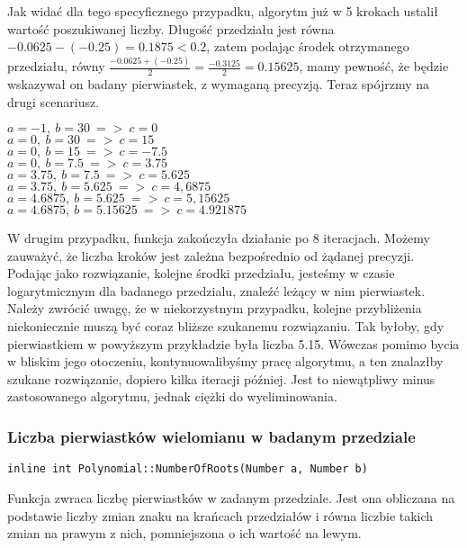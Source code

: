 Jak widać dla tego specyficznego przypadku, algorytm już w 5 krokach ustalił wartość poszukiwanej liczby. Długość przedziału jest równa $-0.0625-(-0.25)=0.1875<0.2$, zatem podając środek otrzymanego przedziału, równy $\frac{-0.0625+(-0.25)}{2}=\frac{-0.3125}{2}=0.15625$, mamy pewność, że będzie wskazywał on badany pierwiastek, z wymaganą precyzją. Teraz spójrzmy na drugi scenariusz.

\begin{example}
	$a = -1,\ b = 30\ =>\ c=0$ \\
	$a = 0,\ b = 30\ =>\ c=15$ \\
	$a = 0,\ b = 15\ =>\ c=-7.5$ \\
	$a = 0,\ b = 7.5\ =>\ c=3.75$ \\
	$a = 3.75,\ b = 7.5\ =>\ c=5.625$ \\
	$a = 3.75,\ b = 5.625\ =>\ c=4,6875$ \\
	$a = 4.6875,\ b = 5.625\ =>\ c=5,15625$ \\
	$a = 4.6875,\ b = 5.15625\ =>\ c=4.921875$
\end{example}

W drugim przypadku, funkcja zakończyła działanie po 8 iteracjach. Możemy zauważyć, że liczba kroków jest zależna bezpośrednio od żądanej precyzji. Podając jako rozwiązanie, kolejne środki przedziału, jesteśmy w czasie logarytmicznym dla badanego przedzialu, znaleźć leżący w nim pierwiastek. Należy zwrócić uwagę, że w niekorzystnym przypadku, kolejne przybliżenia niekoniecznie muszą być coraz bliższe szukanemu rozwiązaniu. Tak byłoby, gdy pierwiastkiem w powyższym przykładzie była liczba 5.15. Wówczas pomimo bycia w bliskim jego otoczeniu, kontynuowalibyśmy pracę algorytmu, a ten znalazłby szukane rozwiązanie, dopiero kilka iteracji później. Jest to niewątpliwy minus zastosowanego algorytmu, jednak ciężki do wyeliminowania.

\subsubsection{Liczba pierwiastków wielomianu w badanym przedziale}
\begin{lstlisting}
inline int Polynomial::NumberOfRoots(Number a, Number b)
\end{lstlisting}

Funkcja zwraca liczbę pierwiastków w zadanym przedziale. Jest ona obliczana na podstawie liczby zmian znaku na krańcach przedziałów i równa liczbie takich zmian na prawym z nich, pomniejszona o ich wartość na lewym.

